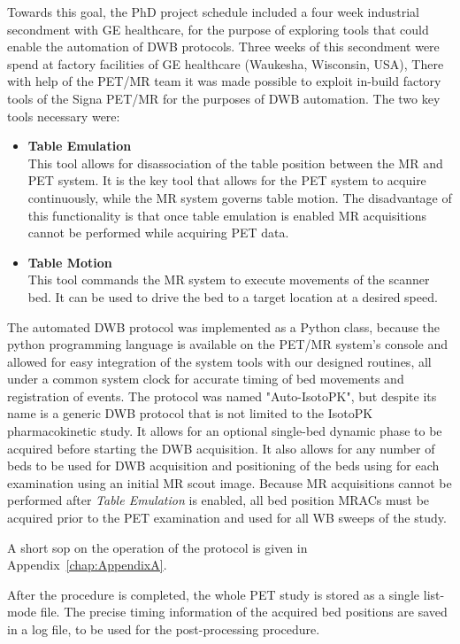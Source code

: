 Towards this goal, the PhD project schedule included a four week industrial secondment with GE healthcare, for the purpose of exploring tools that could enable the automation of DWB protocols. Three weeks of this secondment were spend at factory facilities of GE healthcare (Waukesha, Wisconsin, USA), %
There with help of the PET/MR team it was made possible to exploit in-build factory tools of the Signa PET/MR for the purposes of DWB automation. The two key tools necessary were: 
\begin{itemize}
    \item\textbf{Table Emulation} \\
    This tool allows for disassociation of the table position between the MR and PET system. It is the key tool that allows for the PET system to acquire continuously, while the MR system governs table motion. The disadvantage of this functionality is that once table emulation is enabled MR acquisitions cannot be performed while acquiring PET data.
    \item\textbf{Table Motion} \\
    This tool commands the MR system to execute movements of the scanner bed. It can be used to drive the bed to a target location at a desired speed. 
\end{itemize}

The automated DWB protocol was implemented as a Python class, because the python programming language is available on the PET/MR system's console and allowed for easy integration of the system tools with our designed routines, all under a common system clock for accurate timing of bed movements and registration of events.
The protocol was named "Auto-IsotoPK", but despite its name is a generic DWB protocol that is not limited to the IsotoPK pharmacokinetic study. It allows for an optional single-bed dynamic phase to be acquired before starting the DWB acquisition. It also allows for any number of beds to be used for DWB acquisition and positioning of the beds using for each examination using an initial MR scout image. 
Because MR acquisitions cannot be performed after \textit{Table Emulation} is enabled, all bed position MRACs must be acquired prior to the PET examination and used for all WB sweeps of the study.

A short \gls{sop} on the operation of the protocol is given in Appendix~\ref{chap:AppendixA}.

After the procedure is completed, the whole PET study is stored as a single list-mode file. The precise timing information of the acquired bed positions are saved in a log file, to be used for the post-processing procedure. 

